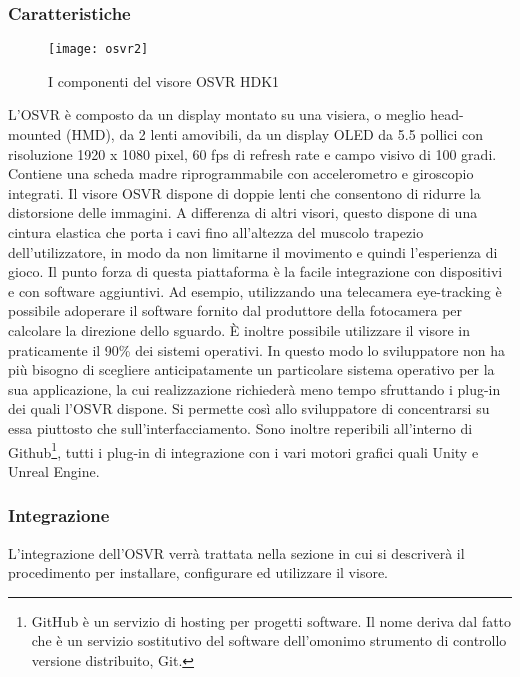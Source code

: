 \subsubsection{Caratteristiche}

\begin{wrapfigure}{r}{0.5\textwidth} %
    \centering
    \vspace{-0.5cm}
    \texttt{[image: osvr2]}
    \caption{I componenti del visore OSVR HDK1}
    \vspace{-0.3cm}
\end{wrapfigure}
L'OSVR è composto da un display montato su una visiera, o meglio head-mounted (HMD), da 2 lenti amovibili, da un display OLED da 5.5 pollici con risoluzione 1920 x 1080 pixel, 60 fps di refresh rate e campo visivo di 100 gradi. Contiene una scheda madre riprogrammabile con accelerometro e giroscopio integrati. Il visore OSVR dispone di doppie lenti che consentono di ridurre la distorsione delle immagini. A differenza di altri visori, questo dispone di una cintura elastica che porta i cavi fino all'altezza del muscolo trapezio dell'utilizzatore, in modo da non limitarne il movimento e quindi l'esperienza di gioco.
Il punto forza di questa piattaforma è la facile integrazione con dispositivi e con software aggiuntivi. Ad esempio, utilizzando una telecamera eye-tracking è possibile adoperare il software fornito dal produttore della fotocamera per calcolare la direzione dello sguardo. È inoltre possibile utilizzare il visore in praticamente il 90\% dei sistemi operativi.
In questo modo lo sviluppatore non ha più bisogno di scegliere anticipatamente un particolare sistema operativo per la sua applicazione, la cui realizzazione richiederà meno tempo sfruttando i plug-in dei quali l'OSVR dispone. Si permette così allo sviluppatore di concentrarsi su essa piuttosto che sull'interfacciamento.
 Sono inoltre reperibili all'interno di Github\footnote{GitHub è un servizio di hosting per progetti software. Il nome deriva dal fatto che è un servizio sostitutivo del software dell'omonimo strumento di controllo versione distribuito, Git.}, tutti i plug-in di integrazione con i vari motori grafici quali Unity e Unreal Engine.
\subsubsection{Integrazione}
L'integrazione dell'OSVR verrà trattata nella sezione \textit{} in cui si descriverà il procedimento per installare, configurare ed utilizzare il visore.


